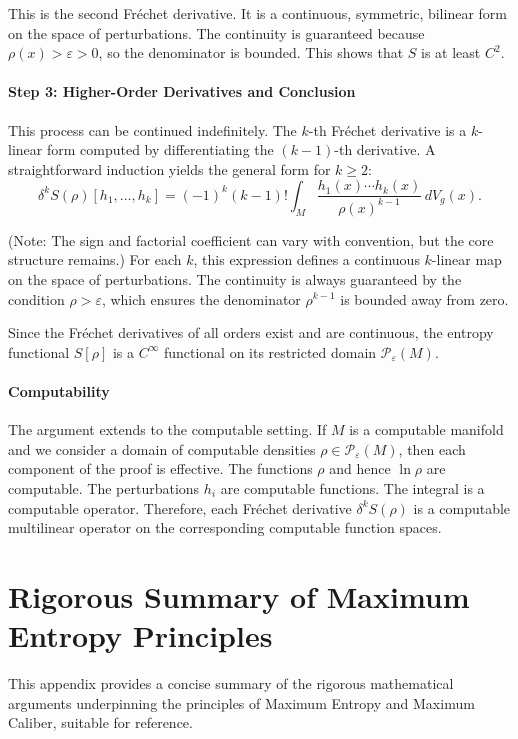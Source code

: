 \documentclass[12pt, a4paper]{article}
\begin{document}
This is the second Fréchet derivative. It is a continuous, symmetric, bilinear form on the space of perturbations. The continuity is guaranteed because $\rho(x) > \varepsilon > 0$, so the denominator is bounded. This shows that $S$ is at least $C^2$.

\paragraph{Step 3: Higher-Order Derivatives and Conclusion}

This process can be continued indefinitely. The $k$-th Fréchet derivative is a $k$-linear form computed by differentiating the $(k-1)$-th derivative. A straightforward induction yields the general form for $k \geq 2$:
\[
\delta^k S(\rho)[h_1, \ldots, h_k] = (-1)^k (k-1)! \int_M \frac{h_1(x) \cdots h_k(x)}{\rho(x)^{k-1}} \, dV_g(x).
\]

(Note: The sign and factorial coefficient can vary with convention, but the core structure remains.) For each $k$, this expression defines a continuous $k$-linear map on the space of perturbations. The continuity is always guaranteed by the condition $\rho > \varepsilon$, which ensures the denominator $\rho^{k-1}$ is bounded away from zero.

Since the Fréchet derivatives of all orders exist and are continuous, the entropy functional $S[\rho]$ is a $C^\infty$ functional on its restricted domain $\mathcal{P}_\varepsilon(M)$.

\paragraph{Computability}

The argument extends to the computable setting. If $M$ is a computable manifold and we consider a domain of computable densities $\rho \in \mathcal{P}_\varepsilon(M)$, then each component of the proof is effective. The functions $\rho$ and hence $\ln \rho$ are computable. The perturbations $h_i$ are computable functions. The integral is a computable operator. Therefore, each Fréchet derivative $\delta^k S(\rho)$ is a computable multilinear operator on the corresponding computable function spaces.


\section{Rigorous Summary of Maximum Entropy Principles}
This appendix provides a concise summary of the rigorous mathematical arguments underpinning the principles of Maximum Entropy and Maximum Caliber, suitable for reference.
\end{document}
